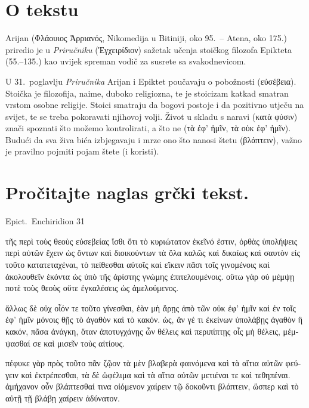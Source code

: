 
\section*{O tekstu}

Arijan \textgreek[variant=ancient]{(Φλάουιος Ἀρριανός,} Nikomedija u Bitiniji, oko 95.\ – Atena, oko 175.) priredio je u \textit{Priručniku} \textgreek[variant=ancient]{(Ἐγχειρίδιον)} sažetak učenja stoičkog filozofa Epikteta (55.–135.) kao uvijek spreman vodič za susrete sa svakodnevicom.

U 31.\ poglavlju \textit{Priručnika} Arijan i Epiktet poučavaju o pobožnosti \textgreek[variant=ancient]{(εὐσέβεια).} Stoička je filozofija, naime, duboko religiozna, te je stoicizam katkad smatran vrstom osobne religije. Stoici smatraju da bogovi postoje i da pozitivno utječu na svijet, te se treba pokoravati njihovoj volji. Život u skladu s naravi \textgreek[variant=ancient]{(κατὰ φύσιν)} znači spoznati što možemo kontrolirati, a što ne \textgreek[variant=ancient]{(τὰ ἐφ' ἡμῖν, τὰ οὐκ ἐφ' ἡμῖν).} Budući da sva živa bića izbjegavaju i mrze ono što nanosi štetu \textgreek[variant=ancient]{(βλάπτειν),} važno je pravilno pojmiti pojam štete (i koristi).


\section*{Pročitajte naglas grčki tekst.}

Epict.\ Enchiridion 31


\medskip


{\large

\begin{greek}

\noindent τῆς περὶ τοὺς θεοὺς εὐσεβείας ἴσθι ὅτι τὸ κυριώτατον ἐκεῖνό ἐστιν, ὀρθὰς ὑπολήψεις περὶ αὐτῶν ἔχειν ὡς ὄντων καὶ διοικούντων τὰ ὅλα καλῶς καὶ δικαίως καὶ σαυτὸν εἰς τοῦτο κατατεταχέναι, τὸ πείθεσθαι αὐτοῖς καὶ εἴκειν πᾶσι τοῖς γινομένοις καὶ ἀκολουθεῖν ἑκόντα ὡς ὑπὸ τῆς ἀρίστης γνώμης ἐπιτελουμένοις. οὕτω γὰρ οὐ μέμψῃ ποτὲ τοὺς θεοὺς οὔτε ἐγκαλέσεις ὡς ἀμελούμενος.

\noindent ἄλλως δὲ οὐχ οἷόν τε τοῦτο γίνεσθαι, ἐὰν μὴ ἄρῃς ἀπὸ τῶν οὐκ ἐφ' ἡμῖν καὶ ἐν τοῖς ἐφ' ἡμῖν μόνοις θῇς τὸ ἀγαθὸν καὶ τὸ κακόν. ὡς, ἄν γέ τι ἐκείνων ὑπολάβῃς ἀγαθὸν ἢ κακόν, πᾶσα ἀνάγκη, ὅταν ἀποτυγχάνῃς ὧν θέλεις καὶ περιπίπτῃς οἷς μὴ θέλεις, μέμψασθαί σε καὶ μισεῖν τοὺς αἰτίους.

\noindent πέφυκε γὰρ πρὸς τοῦτο πᾶν ζῷον τὰ μὲν βλαβερὰ φαινόμενα καὶ τὰ αἴτια αὐτῶν φεύγειν καὶ ἐκτρέπεσθαι, τὰ δὲ ὠφέλιμα καὶ τὰ αἴτια αὐτῶν μετιέναι τε καὶ τεθηπέναι. ἀμήχανον οὖν βλάπτεσθαί τινα οἰόμενον χαίρειν τῷ δοκοῦντι βλάπτειν, ὥσπερ καὶ τὸ αὐτῇ τῇ βλάβῃ χαίρειν ἀδύνατον.

\end{greek}

}


